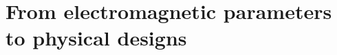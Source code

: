 \documentclass[11pt,a4paper]{article}
\begin{document}
\part{From electromagnetic parameters to physical designs}




\ifshowglossary
  \printnoidxglossary[type=\acronymtype,title={Acronyms}]
  \printnoidxglossary[type=symbols,title={Symbols}]
\fi
\ifshowbibliography
  \printbibliography
\fi
\end{document}
